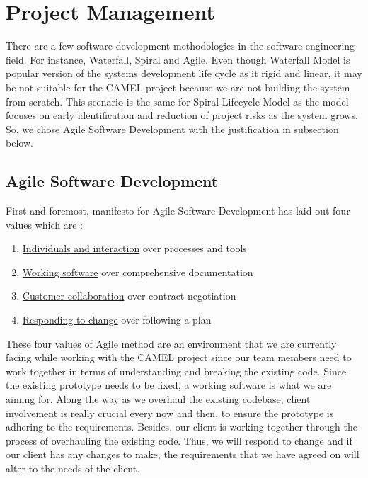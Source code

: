 \section{Project Management}
		There are a few software development methodologies in the software engineering field. For instance, Waterfall, Spiral and Agile. Even though Waterfall Model is popular version of the systems development life cycle as it rigid and linear, it may be not suitable for the CAMEL project because we are not building the system from scratch. This scenario is the same for Spiral Lifecycle Model as the model focuses on early identification and reduction of project risks as the system grows. So, we chose Agile Software Development with the justification in subsection below.
		
		\subsection*{Agile Software Development}
			First and foremost, manifesto for Agile Software Development has laid out four values which are \cite{agileArtOfDevelopment}:
			
			\begin{enumerate}[i]
				\item \underline{Individuals and interaction} over processes and tools
				\item \underline{Working software} over comprehensive documentation
				\item \underline{Customer collaboration} over contract negotiation
				\item \underline{Responding to change} over following a plan
			\end{enumerate}
			
			These four values of Agile method are an environment that we are currently facing while working with the CAMEL project since our team members need to work together in terms of understanding and breaking the existing code. Since the existing prototype needs to be fixed, a working software is what we are aiming for. Along the way as we overhaul the existing codebase, client involvement is really crucial every now and then, to ensure the prototype is adhering to the requirements. Besides, our client is working together through the process of overhauling the existing code. Thus, we will respond to change and if our client has any changes to make, the requirements that we have agreed on will alter to the needs of the client.  
			
